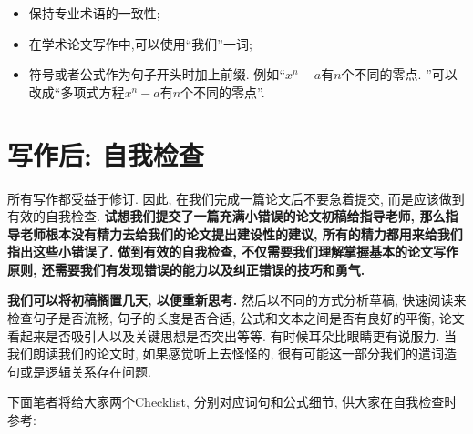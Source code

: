 \documentclass{booki}
\begin{document}
\begin{itemize}
    \item {保持专业术语的一致性}{;}
    \item {在学术论文写作中,可以使用{``}我们''一词}{;}
    \item {符号或者公式作为句子开头时加上前缀.} 例如{``}$x^{n}-a$有$n$个不同的零点. ''可以改成{``}多项式方程$x^{n}-a$有$n$个不同的零点''{.}
\end{itemize}
\section{写作后: 自我检查}
所有写作都受益于修订. 因此, 在我们完成一篇论文后不要急着提交, 而是应该做到有效的自我检查. \textbf{试想我们提交了一篇充满小错误的论文初稿给指导老师, 那么指导老师根本没有精力去给我们的论文提出建设性的建议, 所有的精力都用来给我们指出这些小错误了.} \textbf{做到有效的自我检查, 不仅需要我们理解掌握基本的论文写作原则, 还需要我们有发现错误的能力以及纠正错误的技巧和勇气. }\par
\textbf{我们可以将初稿搁置几天, 以便重新思考. }然后以不同的方式分析草稿, 快速阅读来检查句子是否流畅, 句子的长度是否合适, 公式和文本之间是否有良好的平衡, 论文看起来是否吸引人以及关键思想是否突出等等. 有时候耳朵比眼睛更有说服力. 当我们朗读我们的论文时, 如果感觉听上去怪怪的, 很有可能这一部分我们的遣词造句或是逻辑关系存在问题. \par
{下面笔者将给大家两个Checklist\cite{TanChecklist}, 分别对应词句和公式细节, 供大家在自我检查时参考:}
\end{document}
